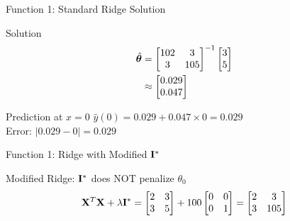 \documentclass{beamer}
\begin{document}
\begin{frame}{Function 1: Standard Ridge Solution}
\begin{codebox}{Solution}
\begin{align}
\hat{\boldsymbol{\theta}} &= \begin{bmatrix} 102 & 3 \\ 3 & 105 \end{bmatrix}^{-1} \begin{bmatrix} 3 \\ 5 \end{bmatrix} \\
&\approx \begin{bmatrix} 0.029 \\ 0.047 \end{bmatrix}
\end{align}
\end{codebox}
\pause

\begin{theorembox}{Prediction at $x=0$}
$\hat{y}(0) = 0.029 + 0.047 \times 0 = 0.029$ \\
{\small Error: $|0.029 - 0| = 0.029$}
\end{theorembox}
\end{frame}

\begin{frame}{Function 1: Ridge with Modified $\mathbf{I}^*$}
\begin{codebox}{Modified Ridge: $\mathbf{I}^*$ does NOT penalize $\theta_0$}
$$\mathbf{X}^T\mathbf{X} + \lambda\mathbf{I}^* = \begin{bmatrix} 2 & 3 \\ 3 & 5 \end{bmatrix} + 100\begin{bmatrix} 0 & 0 \\ 0 & 1 \end{bmatrix} = \begin{bmatrix} 2 & 3 \\ 3 & 105 \end{bmatrix}$$
\end{codebox}
\end{frame}
\end{document}
